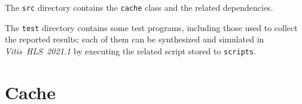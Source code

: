 \documentclass[11pt,a4paper,oneside]{memoir}
\begin{document}
\bigskip
The \texttt{src} directory contains the \texttt{cache} class and the related
dependencies.

The \texttt{test} directory contains some test programs, including those used
to collect the reported results; each of them can be synthesized and simulated
in \emph{Vitis~HLS~2021.1} by executing the related script stored to
\texttt{scripts}.

\section{Cache}


\backmatter

\printbibliography
\end{document}
